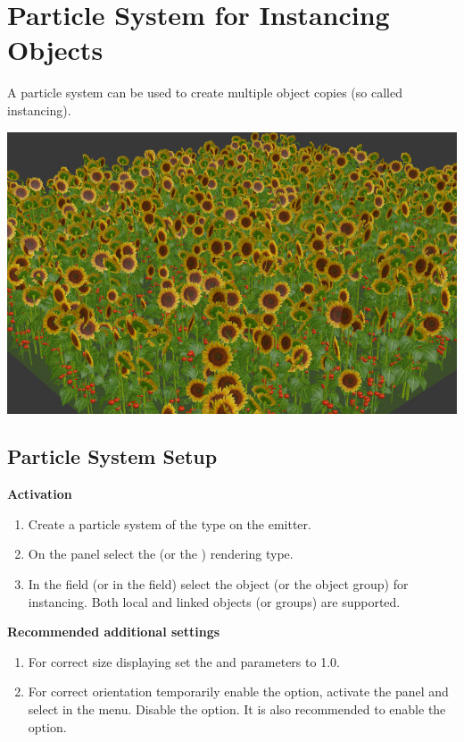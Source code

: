 \documentclass[a4paper,12pt,oneside]{sphinxmanual}
\begin{document}
\chapter{Particle System for Instancing Objects}
\label{particles_instancing:index-0}\label{particles_instancing::doc}\label{particles_instancing:id1}
A particle system can be used to create multiple object copies (so called instancing).

{\hfill\includegraphics[width=1.000\linewidth]{particles_instancing_example.jpg}\hfill}


\section{Particle System Setup}
\label{particles_instancing:id2}
\textbf{Activation}
\begin{enumerate}
\item {} 
Create a particle system of the  type on the emitter.

\item {} 
On the  panel select the  (or the ) rendering type.

\item {} 
In the  field (or in the  field) select the object (or the object group) for instancing. Both local and linked objects (or groups) are supported.

\end{enumerate}

\textbf{Recommended additional settings}
\begin{enumerate}
\item {} 
For correct size displaying set the  and  parameters to 1.0.

\item {} 
For correct orientation temporarily enable the  option, activate the  panel and select  in the  menu. Disable the  option. It is also recommended to enable the  option.

\end{enumerate}
\end{document}
